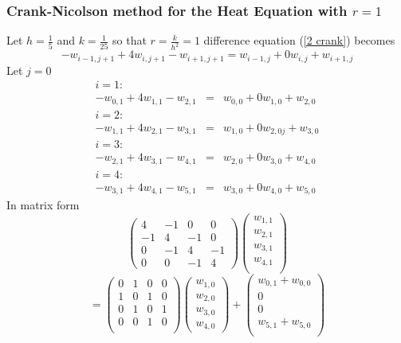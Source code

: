 \begin{example}

\subsubsection{Crank-Nicolson method for the Heat Equation with  $r=1$}
Let $h=\frac{1}{5}$ and $k=\frac{1}{25}$ so that $r=\frac{k}{h^2}=1$
difference equation (\ref{2 crank}) becomes
\[-w_{i-1,j+1}+4w_{i,j+1}-w_{i+1,j+1}=w_{i-1,j}+0w_{i,j}+w_{i+1,j} \]
Let $j=0$
\[\begin{array}{lcl}
i=1:& &\\
-w_{0,1}+4w_{1,1}-w_{2,1}&=&w_{0,0}+0w_{1,0}+w_{2,0}\\
i=2:& &\\
-w_{1,1}+4w_{2,1}-w_{3,1}&=&w_{1,0}+0w_{2,0j}+w_{3,0}\\
i=3:& &\\
-w_{2,1}+4w_{3,1}-w_{4,1}&=&w_{2,0}+0w_{3,0}+w_{4,0}\\
i=4:& &\\
-w_{3,1}+4w_{4,1}-w_{5,1}&=&w_{3,0}+0w_{4,0}+w_{5,0}
\end{array}\]
In matrix form
\[\left(\begin{array}{cccc}
4&-1&0&0\\
-1&4&-1&0\\
0&-1&4&-1\\
0&0&-1&4
\end{array}
\right)
\left(\begin{array}{c}
w_{1,1}\\
w_{2,1}\\
w_{3,1}\\
w_{4,1}\\
\end{array}
\right)\]
\[=\left(\begin{array}{cccc}
0&1&0&0\\
1&0&1&0\\
0&1&0&1\\
0&0&1&0\\

\end{array}
\right)
\left(\begin{array}{c}
w_{1,0}\\
w_{2,0}\\
w_{3,0}\\
w_{4,0}
\end{array}
\right)+
\left(\begin{array}{c}
w_{0,1}+w_{0,0}\\
0\\
0\\
w_{5,1}+w_{5,0}\\
\end{array}
\right)
\]	





\end{example}
